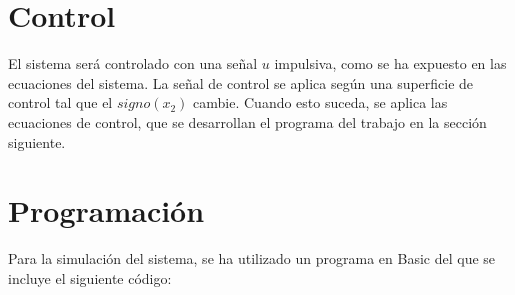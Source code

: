 \documentclass[DIV=20]{scrartcl}
\begin{document}
\section{Control}

El sistema será controlado con una señal $u$ impulsiva, como se ha expuesto en
las ecuaciones del sistema. La señal de control se aplica según una superficie
de control tal que el $signo(x_2)$ cambie. Cuando esto suceda, se aplica las
ecuaciones de control, que se desarrollan el programa del trabajo en la sección siguiente.

\section{Programación}

Para la simulación del sistema, se ha utilizado un programa en Basic del que se
incluye el siguiente código:


\end{document}
